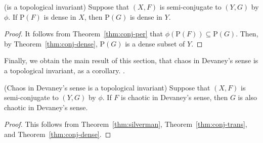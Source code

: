 \documentclass[10pt,draft,twoside]{book}
\begin{document}
\begin{theorem}
  (\dpp is a topological invariant)
  Suppose that $(X,F)$ is semi-conjugate to $(Y,G)$ by $\phi$.
  If $\mathrm{P}(F)$ is dense in $X$, then $\mathrm{P}(G)$ is dense in $Y$.
  \label{cor:conj-dense-per}
  \begin{proof}
    It follows from Theorem~\ref{thm:conj-per} that $\phi(\mathrm{P}(F)) \subseteq \mathrm{P}(G)$.
    Then, by Theorem~\ref{thm:conj-dense}, $\mathrm{P}(G)$ is a dense subset of $Y$.
  \end{proof}
\end{theorem}
Finally, we obtain the main result of this section, that chaos in Devaney's sense is a topological invariant, as a corollary.
.
\begin{corollary}
  (Chaos in Devaney's sense is a topological invariant)
  Suppose that $(X,F)$ is semi-conjugate to $(Y,G)$ by $\phi$.
  If $F$ is chaotic in Devaney's sense, then $G$ is also chaotic in Devaney's sense.
  \label{cor:conj-sdic}
  \begin{proof}
    This follows from Theorem~\ref{thm:silverman}, Theorem~\ref{thm:conj-trans}, and Theorem~\ref{thm:conj-dense}.
  \end{proof}
\end{corollary}
\end{document}
